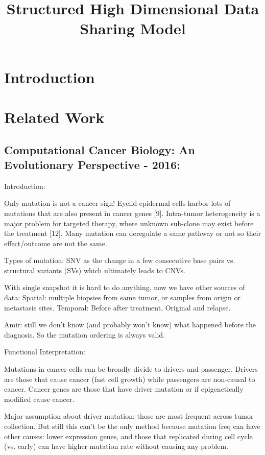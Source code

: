 \documentclass[]{article}
\title{Structured High Dimensional Data Sharing Model}
\author{}
\begin{document}
	
	\maketitle
	
	\begin{abstract}
		
	\end{abstract}
	
	
	\section{Introduction}
	
	
	\section{Related Work}
	\subsection{Computational Cancer Biology: An Evolutionary Perspective - 2016:}
	
	Introduction:
	
	Only mutation is not a cancer sign! Eyelid epidermal cells harbor lots of mutations that are also present in cancer genes [9].
	Intra-tumor heterogeneity is a major problem for targeted therapy, where unknown sub-clone may exist before the treatment [12].
	Many mutation can deregulate a same pathway or not so their effect/outcome are not the same.
	
	Types of mutation: SNV as the change in a few consecutive base pairs vs. structural variants (SVs) which ultimately leads to CNVs. 
	
	With single snapshot it is hard to do anything, now we have other sources of data:
	Spatial: multiple biopsies from same tumor, or samples from origin or metastasis sites. 
	Temporal: Before after treatment, Original and relapse. 
	
	Amir: still we don't know (and probably won't know) what happened before the diagnosis. So the mutation ordering is always valid. 
	
	Functional Interpretation:
	
	Mutations in cancer cells can be broadly divide to drivers and passenger. 
	Drivers are those that cause cancer (fast cell growth) while passengers are non-causal to cancer. 
	Cancer genes are those that have driver mutation or if epigenetically modified cause cancer. 
	
	Major assumption about driver mutation: those are most frequent across tumor collection. 
	But still this can't be the only method because mutation freq can have other causes:
	lower expression genes, and those that replicated during cell cycle (vs. early) can have higher mutation rate without causing any problem. 
	
\end{document}
